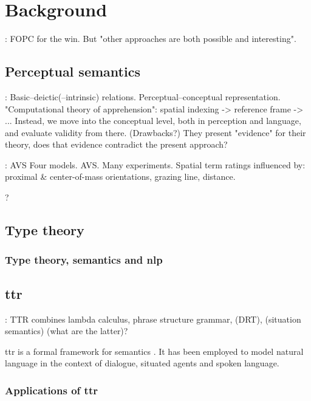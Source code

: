 \documentclass[11pt, a4paper]{article}
\begin{document}
\section{Background}

\cite{BlackburnComputationalsemantics2003}:
FOPC for the win. But "other approaches are both possible and interesting".

\subsection{Perceptual semantics}

\cite{LoganComputationalAnalysisApprehension1996}:
Basic–deictic(–intrinsic) relations.
Perceptual–conceptual representation.
"Computational theory of apprehension": spatial indexing -> reference frame -> ... Instead, we move into the conceptual level, both in perception and language, and evaluate validity from there.
(Drawbacks?)
They present "evidence" for their theory, does that evidence contradict the present approach?

\cite{RegierGroundingspatiallanguage2001a}:
AVS
Four models. AVS.
Many experiments.
Spatial term ratings influenced by: proximal \& center-of-mass orientations, grazing line, distance.

\cite{PustejovskyPerceptualsemanticsconstruction1990}?

\subsection{Type theory}

\subsubsection{Type theory, semantics and \gls{nlp}}

\subsection{\Gls{ttr}}

\citep{CooperRecordsRecordTypes2005}:
TTR combines lambda calculus, phrase structure grammar, (DRT), (situation semantics) (what are the latter)?

\gls{ttr} is a formal framework for semantics \citep{CooperRecordsRecordTypes2005}.
It has been employed to model natural language in the context of dialogue, situated agents and spoken language.

\subsubsection{Applications of \gls{ttr}}
\end{document}
